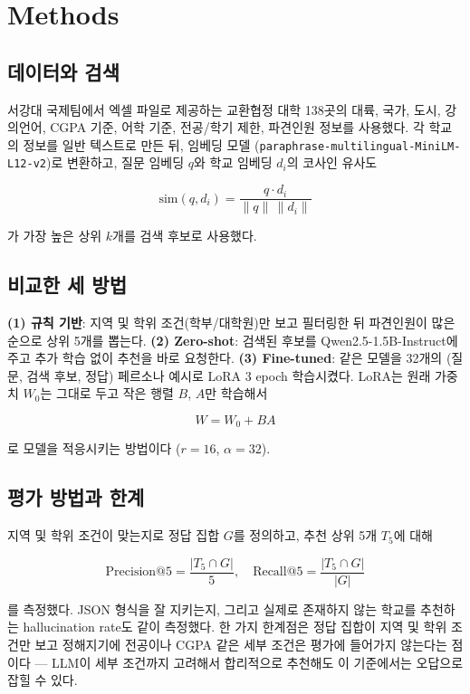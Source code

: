 \documentclass[10pt,twocolumn,letterpaper]{article}
\begin{document}
\section{Methods}
\subsection{데이터와 검색}
서강대 국제팀에서 엑셀 파일로 제공하는 교환협정 대학 138곳의 대륙, 국가, 도시, 강의언어, CGPA 기준, 어학 기준, 전공/학기 제한, 파견인원 정보를 사용했다. 각 학교의 정보를 일반 텍스트로 만든 뒤, 임베딩 모델 (\texttt{paraphrase-multilingual-MiniLM-L12-v2})로 변환하고, 질문 임베딩 $q$와 학교 임베딩
$d_i$의 코사인 유사도

\begin{equation}
\text{sim}(q, d_i) = \frac{q \cdot d_i}{\lVert q \rVert \, \lVert d_i \rVert}
\label{eq:cosine}
\end{equation}

가 가장 높은 상위 $k$개를 검색 후보로 사용했다.

\subsection{비교한 세 방법}
\textbf{(1) 규칙 기반}: 지역 및 학위 조건(학부/대학원)만 보고 필터링한 뒤 파견인원이 많은 순으로 상위 5개를 뽑는다. \textbf{(2) Zero-shot}: 검색된 후보를 Qwen2.5-1.5B-Instruct에
주고 추가 학습 없이 추천을 바로 요청한다. \textbf{(3) Fine-tuned}: 같은 모델을 32개의 (질문, 검색 후보, 정답) 페르소나 예시로 LoRA 3 epoch 학습시켰다. LoRA는 원래 가중치 $W_0$는
그대로 두고 작은 행렬 $B$, $A$만 학습해서

\begin{equation}
W = W_0 + BA
\label{eq:lora}
\end{equation}

로 모델을 적응시키는 방법이다 ($r{=}16$, $\alpha{=}32$).

\subsection{평가 방법과 한계}
지역 및 학위 조건이 맞는지로 정답 집합 $G$를 정의하고, 추천 상위 5개 $T_5$에 대해

\begin{equation}
\text{Precision@5} = \frac{|T_5 \cap G|}{5}, \quad
\text{Recall@5} = \frac{|T_5 \cap G|}{|G|}
\label{eq:pr}
\end{equation}

를 측정했다. JSON 형식을 잘 지키는지, 그리고 실제로 존재하지 않는 학교를 추천하는 hallucination rate도 같이 측정했다. 한 가지 한계점은 정답 집합이 지역 및 학위 조건만 보고 정해지기에 전공이나 CGPA 같은 세부 조건은 평가에 들어가지 않는다는 점이다 — LLM이 세부 조건까지 고려해서 합리적으로 추천해도 이 기준에서는 오답으로 잡힐 수 있다.
\end{document}
